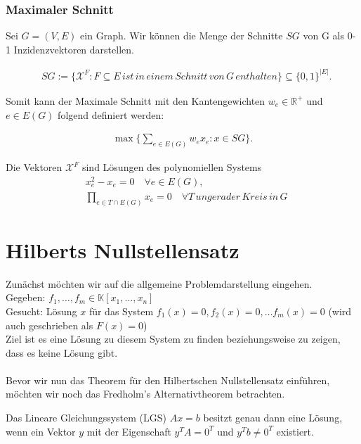 \subsubsection*{Maximaler Schnitt}

\begin{lemma}
Sei $G = (V, E)$ ein Graph. Wir können die Menge der Schnitte $SG$ von G als 0-1 Inzidenzvektoren darstellen.

\begin{align*}
&SG := \{ \mathcal{X}^F:F \subseteq E \, ist \, in \, einem \, Schnitt \, von \, G \, enthalten \} \subseteq  \{0,1\}^{\vert E \vert}.
\end{align*} 

\noindent Somit kann der Maximale Schnitt mit den Kantengewichten $w_e \in \mathbb{R}^+$ und $e \in E(G)$ folgend definiert werden:

\begin{align*}
\max\{\sum_{e \in E(G)} w_e x_e : x \in SG\}. 
\end{align*} 

\noindent Die Vektoren $\mathcal{X}^F$ sind Lösungen des polynomiellen Systems 
\begin{align*}
&x_e^2 - x_e = 0 \quad \forall e \in E(G),\\
&\prod_{e\in T\cap E(G)}x_e = 0 \quad \forall T \, ungerader \, Kreis \, in \, G
\end{align*}
\end{lemma}


\section{Hilberts Nullstellensatz} \label{HilbertNull}

Zunächst möchten wir auf die allgemeine Problemdarstellung eingehen. \\
Gegeben: $f_1,\ldots,f_m \in \mathbb{K}[x_1,\ldots,x_n]$ \\
Gesucht: Lösung $x$ für das System $f_1(x) = 0, f_2(x) = 0, \ldots f_m(x) = 0$ (wird auch geschrieben als $F(x) = 0$) \\
Ziel ist es eine Lösung zu diesem System zu finden beziehungsweise zu zeigen, dass es keine Lösung gibt. \\
\\
Bevor wir nun das Theorem für den Hilbertschen Nullstellensatz einführen, möchten wir noch das Fredholm's Alternativtheorem betrachten.

\begin{theorem} \label{Fredi}
Das Lineare Gleichungssystem (LGS) $Ax=b$ besitzt genau dann eine Lösung, wenn ein Vektor $y$ mit der Eigenschaft $y^TA=0^T$ und $y^Tb\neq 0^T$ existiert. 
\end{theorem}

